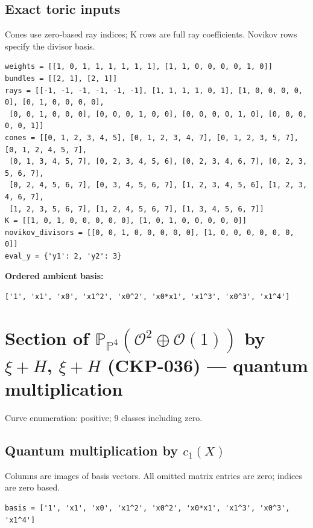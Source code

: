 \documentclass[10pt,a4paper]{article}
\begin{document}
\subsection*{Exact toric inputs}
Cones use zero-based ray indices; K rows are full ray coefficients. Novikov rows specify the divisor basis.

\begin{lstlisting}
weights = [[1, 0, 1, 1, 1, 1, 1, 1], [1, 1, 0, 0, 0, 0, 1, 0]]
bundles = [[2, 1], [2, 1]]
rays = [[-1, -1, -1, -1, -1, -1], [1, 1, 1, 1, 0, 1], [1, 0, 0, 0, 0, 0], [0, 1, 0, 0, 0, 0],
 [0, 0, 1, 0, 0, 0], [0, 0, 0, 1, 0, 0], [0, 0, 0, 0, 1, 0], [0, 0, 0, 0, 0, 1]]
cones = [[0, 1, 2, 3, 4, 5], [0, 1, 2, 3, 4, 7], [0, 1, 2, 3, 5, 7], [0, 1, 2, 4, 5, 7],
 [0, 1, 3, 4, 5, 7], [0, 2, 3, 4, 5, 6], [0, 2, 3, 4, 6, 7], [0, 2, 3, 5, 6, 7],
 [0, 2, 4, 5, 6, 7], [0, 3, 4, 5, 6, 7], [1, 2, 3, 4, 5, 6], [1, 2, 3, 4, 6, 7],
 [1, 2, 3, 5, 6, 7], [1, 2, 4, 5, 6, 7], [1, 3, 4, 5, 6, 7]]
K = [[1, 0, 1, 0, 0, 0, 0, 0], [1, 0, 1, 0, 0, 0, 0, 0]]
novikov_divisors = [[0, 0, 1, 0, 0, 0, 0, 0], [1, 0, 0, 0, 0, 0, 0, 0]]
eval_y = {'y1': 2, 'y2': 3}
\end{lstlisting}

\textbf{Ordered ambient basis:}
\begin{lstlisting}
['1', 'x1', 'x0', 'x1^2', 'x0^2', 'x0*x1', 'x1^3', 'x0^3', 'x1^4']
\end{lstlisting}

\clearpage\section*{Section of $\mathbb P_{\mathbb P^{4}}(\mathcal O^{2}\oplus \mathcal O(1))$ by $\xi +H$, $\xi +H$ (CKP-036) --- quantum multiplication}

Curve enumeration: positive; 9 classes including zero.
\subsection*{Quantum multiplication by $c_1(X)$}
Columns are images of basis vectors. All omitted matrix entries are zero; indices are zero based.

\begin{lstlisting}
basis = ['1', 'x1', 'x0', 'x1^2', 'x0^2', 'x0*x1', 'x1^3', 'x0^3', 'x1^4']
\end{lstlisting}
\end{document}
